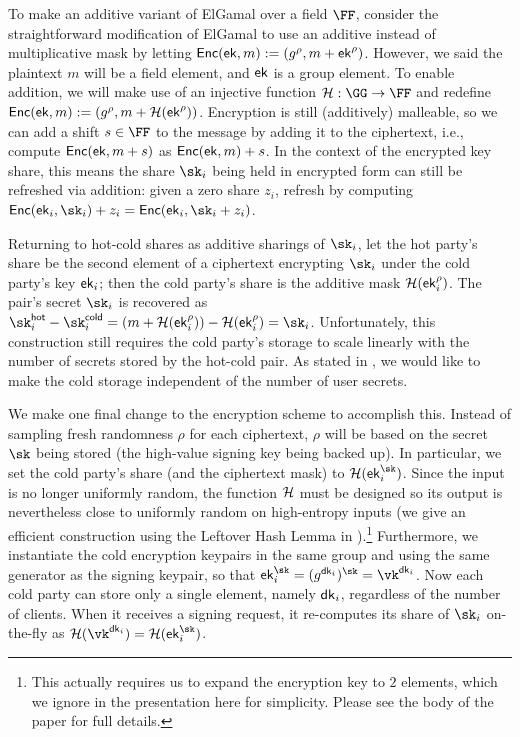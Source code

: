 To make an additive variant of ElGamal over a field $\FF$, consider the straightforward modification of ElGamal to use an additive instead of multiplicative mask by letting $\mathsf{Enc}(\mathsf{ek}, m) := (g^\rho, m + \mathsf{ek}^\rho)$. However, we said the plaintext $m$ will be a field element, and $\mathsf{ek}$ is a group element. To enable addition, we will make use of an injective function $\lhlhash: \GG \to \FF$ and redefine $\mathsf{Enc}(\mathsf{ek}, m) := (g^\rho, m + \mathcal{H}(\mathsf{ek}^\rho))$. Encryption is still (additively) malleable, so we can add a shift $s \in \FF$ to the message by adding it to the ciphertext, i.e., compute $\mathsf{Enc}(\mathsf{ek}, m + s)$ as $\mathsf{Enc}(\mathsf{ek}, m) + s$. In the context of the encrypted key share, this means the share $\sk_i$ being held in encrypted form can still be refreshed via addition: given a zero share $z_i$, refresh by computing $\enc(\ek_i, \sk_i) + z_i = \enc(\ek_i, \sk_i + z_i)$.

Returning to hot-cold shares as additive sharings of $\sk_i$, let the hot party's share be the second element of a ciphertext encrypting $\sk_i$ under the cold party's key $\mathsf{ek}_i$; then the cold party's share is the additive mask $\mathcal{H}(\mathsf{ek}_i^\rho)$. The pair's secret $\sk_i$ is recovered as $\sk_i^\hot - \sk_i^\cold = (m+\lhlhash(\ek_i^\rho)) - \lhlhash(\ek_i^\rho) = \sk_i$. Unfortunately, this construction still requires the cold party's storage to scale linearly with the number of secrets stored by the hot-cold pair. As stated in , we would like to make the cold storage independent of the number of user secrets.

We make one final change to the encryption scheme to accomplish this. Instead of sampling fresh randomness $\rho$ for each ciphertext, $\rho$ will be based on the secret $\sk$ being stored (the high-value signing key being backed up). In particular, we set the cold party's share (and the ciphertext mask) to $\lhlhash(\ek_i^{\sk})$. Since the input is no longer uniformly random, the function $\mathcal{H}$ must be designed so its output is nevertheless close to uniformly random on high-entropy inputs (we give an efficient construction using the Leftover Hash Lemma in ).\footnote{This actually requires us to expand the encryption key to $2$ elements, which we ignore in the presentation here for simplicity.  Please see the body of the paper for full details.} Furthermore, we instantiate the cold encryption keypairs in the same group and using the same generator as the signing keypair, so that $\ek_i^{\sk} = (g^{\dk_i})^{\sk} = \vk^{\dk_i}$. Now each cold party can store only a single element, namely $\mathsf{dk}_i$, regardless of the number of clients. When it receives a signing request, it re-computes its share of $\sk_i$ on-the-fly as $\lhlhash(\vk^{\dk_i}) = \lhlhash(\ek_i^{\sk})$.


